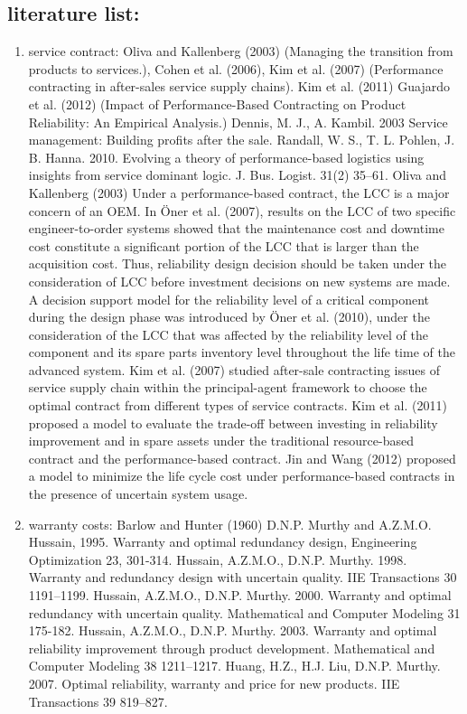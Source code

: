 \documentclass[preprint,12pt]{elsarticle}
\begin{document}
\subsection {literature list:}
\begin{enumerate}
\item service contract: Oliva and Kallenberg (2003) (Managing the transition from products to services.), Cohen et al. (2006), Kim et al. (2007) (Performance contracting in after-sales service supply chains).	Kim et al. (2011)	Guajardo et al. (2012) (Impact of Performance-Based Contracting on Product Reliability: An Empirical Analysis.)	Dennis, M. J., A. Kambil. 2003 Service management: Building profits after the sale. Randall, W. S., T. L. Pohlen, J. B. Hanna. 2010. Evolving a theory of performance-based logistics using insights from service dominant logic. J. Bus. Logist. 31(2) 35–61.
    Oliva and Kallenberg (2003) 
   Under a performance-based contract, the LCC is a major concern of an OEM. In Öner et al. (2007), results on the LCC of two specific engineer-to-order systems showed that the maintenance cost and downtime cost constitute a significant portion of the LCC that is larger than the acquisition cost. Thus, reliability design decision should be taken under the consideration of LCC before investment decisions on new systems are made. A decision support model for the reliability level of a critical component during the design phase was introduced by Öner et al. (2010), under the consideration of the LCC that was affected by the reliability level of the component and its spare parts inventory level throughout the life time of the advanced system. Kim et al. (2007) studied after-sale contracting issues of service supply chain within the principal-agent framework to choose the optimal contract from different types of service contracts. Kim et al. (2011) proposed a model to evaluate the trade-off between investing in reliability improvement and in spare assets under the traditional resource-based contract and the performance-based contract. Jin and Wang (2012) proposed a model to minimize the life cycle cost under performance-based contracts in the presence of uncertain system usage.

\item warranty costs: Barlow and Hunter (1960)	D.N.P. Murthy and A.Z.M.O. Hussain, 1995. Warranty and optimal redundancy design, Engineering Optimization 23, 301-314. Hussain, A.Z.M.O., D.N.P. Murthy. 1998.  Warranty and redundancy design with uncertain quality. IIE Transactions 30 1191–1199. Hussain, A.Z.M.O., D.N.P. Murthy. 2000. Warranty and optimal redundancy with uncertain quality. Mathematical and Computer Modeling 31 175-182. Hussain, A.Z.M.O., D.N.P. Murthy. 2003. Warranty and optimal reliability improvement through product development. Mathematical and Computer Modeling 38 1211–1217.	Huang, H.Z., H.J. Liu, D.N.P. Murthy. 2007. Optimal reliability, warranty and price for new products. IIE Transactions 39 819–827.


\end{enumerate}
\end{document}
